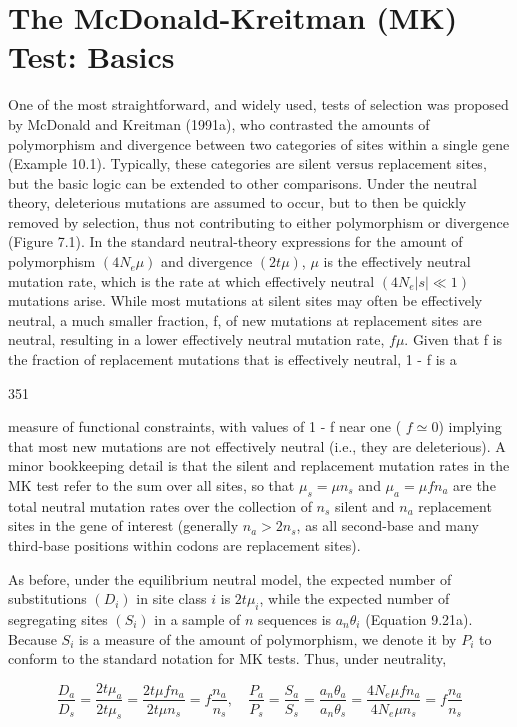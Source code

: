 \documentclass{article}
\begin{document}
\section{The McDonald-Kreitman (MK) Test: Basics}
One of the most straightforward, and widely used, tests of selection was proposed by McDonald and Kreitman (1991a), who contrasted the amounts of polymorphism and divergence between two categories of sites within a single gene (Example 10.1). Typically, these categories are silent versus replacement sites, but the basic logic can be extended to other comparisons. Under the neutral theory, deleterious mutations are assumed to occur, but to then be quickly removed by selection, thus not contributing to either polymorphism or divergence (Figure 7.1). In the standard neutral-theory expressions for the amount of polymorphism  $ (4N_{e}\mu) $ and divergence  $ (2t\mu) $,  $ \mu $ is the effectively neutral mutation rate, which is the rate at which effectively neutral  $ (4N_{e}|s|\ll1) $ mutations arise. While most mutations at silent sites may often be effectively neutral, a much smaller fraction, f, of new mutations at replacement sites are neutral, resulting in a lower effectively neutral mutation rate,  $ f\mu $. Given that f is the fraction of replacement mutations that is effectively neutral, 1 - f is a

351

measure of functional constraints, with values of 1 - f near one ( $ f \simeq 0 $) implying that most new mutations are not effectively neutral (i.e., they are deleterious). A minor bookkeeping detail is that the silent and replacement mutation rates in the MK test refer to the sum over all sites, so that  $ \mu_s = \mu n_s $ and  $ \mu_a = \mu f n_a $ are the total neutral mutation rates over the collection of  $ n_s $ silent and  $ n_a $ replacement sites in the gene of interest (generally  $ n_a > 2n_s $, as all second-base and many third-base positions within codons are replacement sites).

As before, under the equilibrium neutral model, the expected number of substitutions  $ (D_i) $ in site class  $ i $ is  $ 2t\mu_i $, while the expected number of segregating sites  $ (S_i) $ in a sample of  $ n $ sequences is  $ a_n\theta_i $ (Equation 9.21a). Because  $ S_i $ is a measure of the amount of polymorphism, we denote it by  $ P_i $ to conform to the standard notation for MK tests. Thus, under neutrality,

\begin{equation}
\frac{D_{a}}{D_{s}}=\frac{2t\mu_{a}}{2t\mu_{s}}=\frac{2t\mu f n_{a}}{2t\mu n_{s}}=f\frac{n_{a}}{n_{s}},\quad\frac{P_{a}}{P_{s}}=\frac{S_{a}}{S_{s}}=\frac{a_{n}\theta_{a}}{a_{n}\theta_{s}}=\frac{4N_{e}\mu f n_{a}}{4N_{e}\mu n_{s}}=f\frac{n_{a}}{n_{s}}
\tag{10.5a}
\label{eq:10_5a}
\end{equation}
\end{document}
